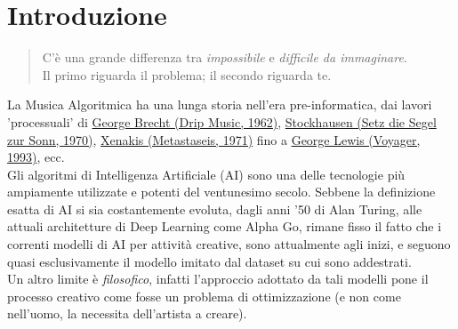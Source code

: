 \documentclass[a4paper,12pt]{report}
\begin{document}
\tableofcontents

\chapter{Introduzione}

\begin{quote}
\centering

C’è una grande differenza tra \textit{impossibile} e \textit{difficile da immaginare}. \\
Il primo riguarda il problema; il secondo riguarda te.

\end{quote}

La Musica Algoritmica ha una lunga storia nell'era pre-informatica, dai lavori 'processuali' di \href{https://youtu.be/UT5lgaE-qZY}{George Brecht (Drip Music, 1962)}, \href{https://youtu.be/pxs35GrZVAs}{Stockhausen (Setz die Segel zur Sonn, 1970)}, \href{https://youtu.be/SZazYFchLRI}{Xenakis (Metastaseis, 1971)} fino a \href{https://youtu.be/o9UsLbsdA6s}{George Lewis (Voyager, 1993)}, ecc. \\

Gli algoritmi di Intelligenza Artificiale (AI) sono una delle tecnologie più ampiamente utilizzate e potenti del ventunesimo secolo. Sebbene la definizione esatta di AI si sia costantemente evoluta, dagli anni '50 di Alan Turing, alle attuali architetture di Deep Learning come Alpha Go, 
rimane fisso il fatto che i correnti modelli di AI per attività creative, sono attualmente agli inizi, e seguono quasi esclusivamente il modello imitato dal dataset su cui sono addestrati. \\
Un altro limite è \textit{filosofico}, infatti l'approccio adottato da tali modelli pone il processo creativo come fosse un problema di ottimizzazione (e non come nell'uomo, la necessita dell'artista a creare). \\ 
\end{document}

